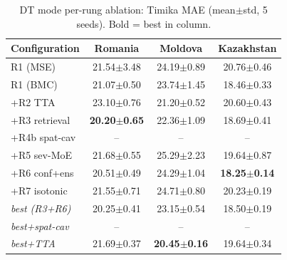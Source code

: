 \begin{table}[t]
\centering\small
\caption{DT mode per-rung ablation: Timika MAE (mean$\pm$std, 5 seeds). Bold = best in column.}
\label{tab:abl_a3}
\setlength{\tabcolsep}{4pt}
\begin{tabular}{l c c c}
\toprule
Configuration & Romania & Moldova & Kazakhstan \\
\midrule
R1 (MSE) & 21.54$\pm$3.48 & 24.19$\pm$0.89 & 20.76$\pm$0.46 \\
R1 (BMC) & 21.07$\pm$0.50 & 23.74$\pm$1.45 & 18.46$\pm$0.33 \\
+R2 TTA & 23.10$\pm$0.76 & 21.20$\pm$0.52 & 20.60$\pm$0.43 \\
+R3 retrieval & \textbf{20.20$\pm$0.65} & 22.36$\pm$1.09 & 18.69$\pm$0.41 \\
+R4b spat-cav & -- & -- & -- \\
+R5 sev-MoE & 21.68$\pm$0.55 & 25.29$\pm$2.23 & 19.64$\pm$0.87 \\
+R6 conf+ens & 20.51$\pm$0.49 & 24.29$\pm$1.04 & \textbf{18.25$\pm$0.14} \\
+R7 isotonic & 21.55$\pm$0.71 & 24.71$\pm$0.80 & 20.23$\pm$0.19 \\
\textit{best (R3+R6)} & 20.25$\pm$0.41 & 23.15$\pm$0.54 & 18.50$\pm$0.19 \\
\textit{best+spat-cav} & -- & -- & -- \\
\textit{best+TTA} & 21.69$\pm$0.37 & \textbf{20.45$\pm$0.16} & 19.64$\pm$0.34 \\
\bottomrule
\end{tabular}
\end{table}